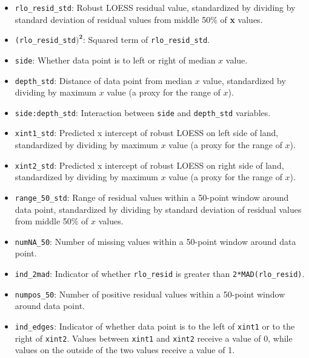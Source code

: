 \documentclass[12pt]{article}
\begin{document}
\begin{itemize}

\item[] \texttt{rlo\_resid\_std}: Robust LOESS residual value, standardized by dividing by standard deviation of residual values from middle 50\% of \textbf{x} values.  

\item[] \texttt{(rlo\_resid\_std$\mathbf{)^2}$}: Squared term of \texttt{rlo\_resid\_std}.  

\item[] \texttt{side}: Whether data point is to left or right of median $x$ value.  

\item[] \texttt{depth\_std}: Distance of data point from median $x$ value, standardized by dividing by maximum $x$ value (a proxy for the range of $x$).  

\item[] \texttt{side:depth\_std}: Interaction between \texttt{side} and \texttt{depth\_std} variables.  

\item[] \texttt{xint1\_std}: Predicted x intercept of robust LOESS on left side of land, standardized by dividing by maximum $x$ value (a proxy for the range of $x$).  

\item[] \texttt{xint2\_std}: Predicted x intercept of robust LOESS on right side of land, standardized by dividing by maximum $x$ value (a proxy for the range of $x$).  

\item[] \texttt{range\_50\_std}: Range of residual values within a 50-point window around data point, standardized by dividing by standard deviation of residual values from middle 50\% of $x$ values.  

\item[] \texttt{numNA\_50}: Number of missing values within a 50-point window around data point.  

\item[] \texttt{ind\_2mad}: Indicator of whether \texttt{rlo\_resid} is greater than \texttt{2*MAD(rlo\_resid)}.  

\item[] \texttt{numpos\_50}: Number of positive residual values within a 50-point window around data point.  

\item[] \texttt{ind\_edges}: Indicator of whether data point is to the left of \texttt{xint1} or to the right of \texttt{xint2}. Values between \texttt{xint1} and \texttt{xint2} receive a value of 0, while values on the outside of the two values receive a value of 1.  

\end{itemize}
\end{document}
